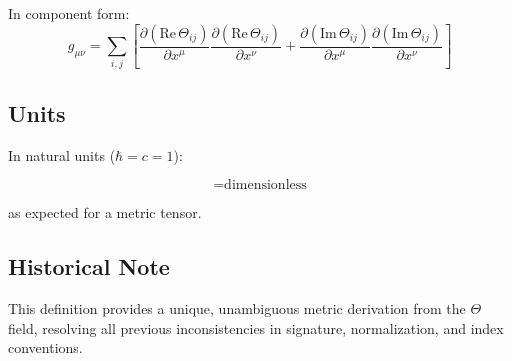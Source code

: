 In component form:
\begin{equation}
g_{\mu\nu} = \sum_{i,j} \left[\frac{\partial(\text{Re}\,\Theta_{ij})}{\partial x^\mu}\frac{\partial(\text{Re}\,\Theta_{ij})}{\partial x^\nu} + \frac{\partial(\text{Im}\,\Theta_{ij})}{\partial x^\mu}\frac{\partial(\text{Im}\,\Theta_{ij})}{\partial x^\nu}\right]
\end{equation}

\subsection{Units}

In natural units ($\hbar = c = 1$):

\begin{equation}
[g_{\mu\nu}] = \text{dimensionless}
\end{equation}

as expected for a metric tensor.

\subsection{Historical Note}

This definition provides a unique, unambiguous metric derivation from the $\Theta$ field, resolving all previous inconsistencies in signature, normalization, and index conventions.

